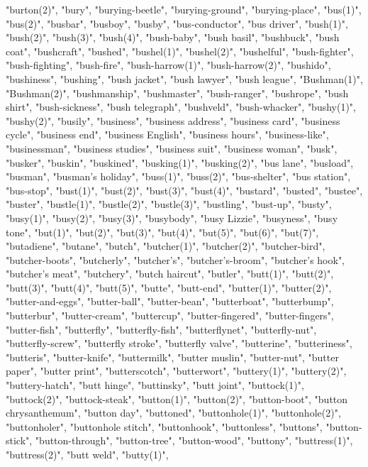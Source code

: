 "burton(2)",
"bury",
"burying-beetle",
"burying-ground",
"burying-place",
"bus(1)",
"bus(2)",
"busbar",
"busboy",
"busby",
"bus-conductor",
"bus driver",
"bush(1)",
"bush(2)",
"bush(3)",
"bush(4)",
"bush-baby",
"bush basil",
"bushbuck",
"bush coat",
"bushcraft",
"bushed",
"bushel(1)",
"bushel(2)",
"bushelful",
"bush-fighter",
"bush-fighting",
"bush-fire",
"bush-harrow(1)",
"bush-harrow(2)",
"bushido",
"bushiness",
"bushing",
"bush jacket",
"bush lawyer",
"bush league",
"Bushman(1)",
"Bushman(2)",
"bushmanship",
"bushmaster",
"bush-ranger",
"bushrope",
"bush shirt",
"bush-sickness",
"bush telegraph",
"bushveld",
"bush-whacker",
"bushy(1)",
"bushy(2)",
"busily",
"business",
"business address",
"business card",
"business cycle",
"business end",
"business English",
"business hours",
"business-like",
"businessman",
"business studies",
"business suit",
"business woman",
"busk",
"busker",
"buskin",
"buskined",
"busking(1)",
"busking(2)",
"bus lane",
"busload",
"busman",
"busman's holiday",
"buss(1)",
"buss(2)",
"bus-shelter",
"bus station",
"bus-stop",
"bust(1)",
"bust(2)",
"bust(3)",
"bust(4)",
"bustard",
"busted",
"bustee",
"buster",
"bustle(1)",
"bustle(2)",
"bustle(3)",
"bustling",
"bust-up",
"busty",
"busy(1)",
"busy(2)",
"busy(3)",
"busybody",
"busy Lizzie",
"busyness",
"busy tone",
"but(1)",
"but(2)",
"but(3)",
"but(4)",
"but(5)",
"but(6)",
"but(7)",
"butadiene",
"butane",
"butch",
"butcher(1)",
"butcher(2)",
"butcher-bird",
"butcher-boots",
"butcherly",
"butcher's",
"butcher's-broom",
"butcher's hook",
"butcher's meat",
"butchery",
"butch haircut",
"butler",
"butt(1)",
"butt(2)",
"butt(3)",
"butt(4)",
"butt(5)",
"butte",
"butt-end",
"butter(1)",
"butter(2)",
"butter-and-eggs",
"butter-ball",
"butter-bean",
"butterboat",
"butterbump",
"butterbur",
"butter-cream",
"buttercup",
"butter-fingered",
"butter-fingers",
"butter-fish",
"butterfly",
"butterfly-fish",
"butterflynet",
"butterfly-nut",
"butterfly-screw",
"butterfly stroke",
"butterfly valve",
"butterine",
"butteriness",
"butteris",
"butter-knife",
"buttermilk",
"butter muslin",
"butter-nut",
"butter paper",
"butter print",
"butterscotch",
"butterwort",
"buttery(1)",
"buttery(2)",
"buttery-hatch",
"butt hinge",
"buttinsky",
"butt joint",
"buttock(1)",
"buttock(2)",
"buttock-steak",
"button(1)",
"button(2)",
"button-boot",
"button chrysanthemum",
"button day",
"buttoned",
"buttonhole(1)",
"buttonhole(2)",
"buttonholer",
"buttonhole stitch",
"buttonhook",
"buttonless",
"buttons",
"button-stick",
"button-through",
"button-tree",
"button-wood",
"buttony",
"buttress(1)",
"buttress(2)",
"butt weld",
"butty(1)",
